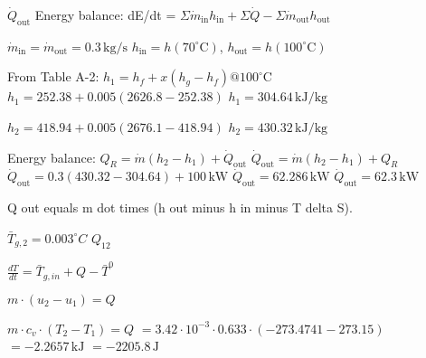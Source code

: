 \( \dot{Q}_{\text{out}} \)  
Energy balance:  
dE/dt = \( \Sigma \dot{m}_{\text{in}} h_{\text{in}} + \Sigma \dot{Q} - \Sigma \dot{m}_{\text{out}} h_{\text{out}} \)  

\( \dot{m}_{\text{in}} = \dot{m}_{\text{out}} = 0.3 \, \text{kg/s} \)  
\( h_{\text{in}} = h(70^\circ \text{C}) \), \( h_{\text{out}} = h(100^\circ \text{C}) \)  

From Table A-2:  
\( h_1 = h_f + x(h_g - h_f) @ 100^\circ \text{C} \)  
\( h_1 = 252.38 + 0.005(2626.8 - 252.38) \)  
\( h_1 = 304.64 \, \text{kJ/kg} \)  

\( h_2 = 418.94 + 0.005(2676.1 - 418.94) \)  
\( h_2 = 430.32 \, \text{kJ/kg} \)  

Energy balance:  
\( Q_R = \dot{m}(h_2 - h_1) + \dot{Q}_{\text{out}} \)  
\( \dot{Q}_{\text{out}} = \dot{m}(h_2 - h_1) + Q_R \)  
\( \dot{Q}_{\text{out}} = 0.3(430.32 - 304.64) + 100 \, \text{kW} \)  
\( \dot{Q}_{\text{out}} = 62.286 \, \text{kW} \)  
\( \dot{Q}_{\text{out}} = 62.3 \, \text{kW} \)

Q out equals m dot times (h out minus h in minus T delta S).

\( \bar{T}_{g,2} = 0.003^\circ C \)  
\( Q_{12} \)  

\( \frac{dT}{dt} = \bar{T}_{g,in} + Q - \bar{T}^0 \)  

\( m \cdot (u_2 - u_1) = Q \)  

\( m \cdot c_v \cdot (T_2 - T_1) = Q \)  
\( = 3.42 \cdot 10^{-3} \cdot 0.633 \cdot (-273.4741 - 273.15) \)  
\( = -2.2657 \, \text{kJ} \)  
\( = -2205.8 \, \text{J} \)
